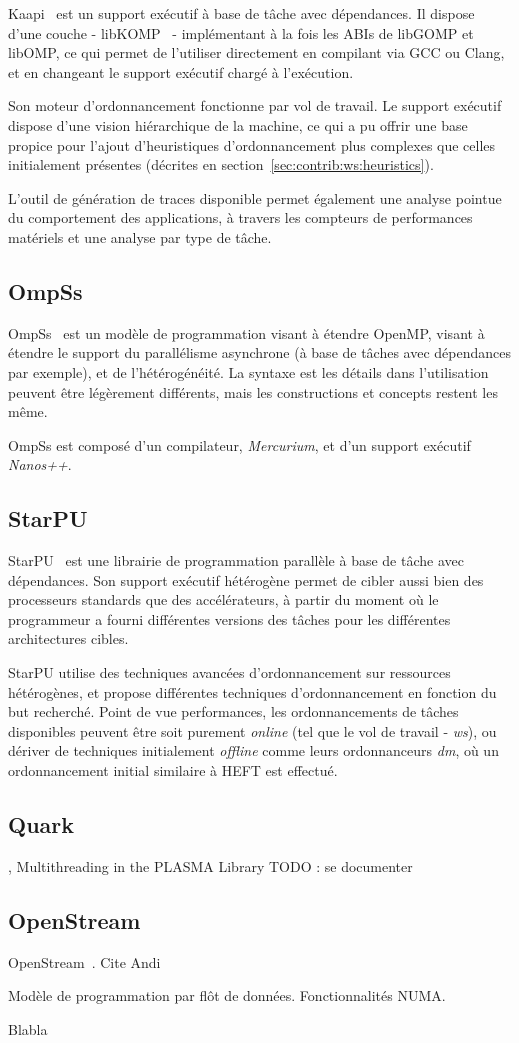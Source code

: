 Kaapi~\cite{Gautier2007} est un support exécutif à base de tâche avec dépendances.
Il dispose d'une couche - libKOMP~\cite{Broquedis2012} - implémentant à la fois les ABIs de libGOMP et libOMP, ce qui permet de l'utiliser directement en compilant via GCC ou Clang, et en changeant le support exécutif chargé à l'exécution.

Son moteur d'ordonnancement fonctionne par vol de travail.
Le support exécutif dispose d'une vision hiérarchique de la machine, ce qui a pu offrir une base propice pour l'ajout d'heuristiques d'ordonnancement plus complexes que celles initialement présentes (décrites en section~\ref{sec:contrib:ws:heuristics}).

L'outil de génération de traces disponible permet également une analyse pointue du comportement des applications, à travers les compteurs de performances matériels et une analyse par type de tâche.


\subsection{OmpSs}\label{subsec:rw:ompss}

OmpSs~\cite{OMPSs} est un modèle de programmation visant à étendre OpenMP, visant à étendre le support du parallélisme asynchrone (à base de tâches avec dépendances par exemple), et de l'hétérogénéité.
La syntaxe est les détails dans l'utilisation peuvent être légèrement différents, mais les constructions et concepts restent les même.

OmpSs est composé d'un compilateur, \emph{Mercurium}, et d'un support exécutif \emph{Nanos++}.

\subsection{StarPU}

StarPU~\cite{StarPU} est une librairie de programmation parallèle à base de tâche avec dépendances.
Son support exécutif hétérogène permet de cibler aussi bien des processeurs standards que des accélérateurs, à partir du moment où le programmeur a fourni différentes versions des tâches pour les différentes architectures cibles.

StarPU utilise des techniques avancées d'ordonnancement sur ressources hétérogènes, et propose différentes techniques d'ordonnancement en fonction du but recherché.
Point de vue performances, les ordonnancements de tâches disponibles peuvent être soit purement \emph{online} (tel que le vol de travail - \emph{ws}), ou dériver de techniques initialement \emph{offline} comme leurs ordonnanceurs \emph{dm}, où un ordonnancement initial similaire à HEFT est effectué.

\subsection{Quark}

\cite{Kurzak2013}, Multithreading in the PLASMA Library
TODO : se documenter

\subsection{OpenStream}

OpenStream~\cite{Pop2013}.
Cite Andi

Modèle de programmation par flôt de données.
Fonctionnalités NUMA.


Blabla
